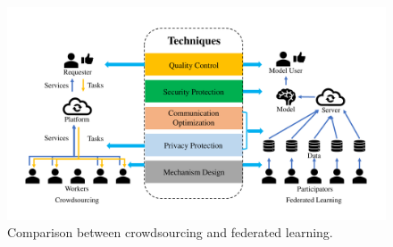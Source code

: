 \documentclass[11pt]{article}
\begin{document}
\begin{figure}
\centering
\includegraphics[scale=0.5]{submissions/yongxin/figs/fig1.pdf}
\caption{Comparison between crowdsourcing and federated learning.}
\label{fig:comparison}
\end{figure}
\end{document}
